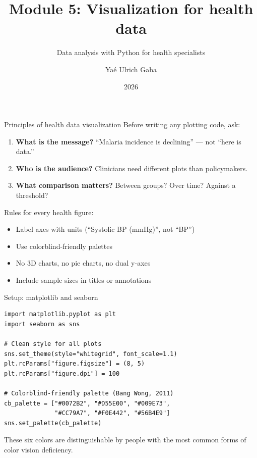 \documentclass[aspectratio=169,11pt]{beamer}
\title{Module 5: Visualization for health data}
\subtitle{Data analysis with Python for health specialists}
\author{Yaé Ulrich Gaba}
\institute{AIRINA Labs}
\date{2026}
\begin{document}
\maketitle

\begin{frame}{Principles of health data visualization}
Before writing any plotting code, ask:
\begin{enumerate}
  \item \textbf{What is the message?} ``Malaria incidence is declining'' --- not ``here is data.''
  \item \textbf{Who is the audience?} Clinicians need different plots than policymakers.
  \item \textbf{What comparison matters?} Between groups? Over time? Against a threshold?
\end{enumerate}

\vspace{6pt}
Rules for \alert{every} health figure:
\begin{itemize}
  \item Label axes with units (``Systolic BP (mmHg)'', not ``BP'')
  \item Use colorblind-friendly palettes
  \item No 3D charts, no pie charts, no dual y-axes
  \item Include sample sizes in titles or annotations
\end{itemize}
\end{frame}

\begin{frame}[fragile]{Setup: matplotlib and seaborn}
\begin{verbatim}
import matplotlib.pyplot as plt
import seaborn as sns

# Clean style for all plots
sns.set_theme(style="whitegrid", font_scale=1.1)
plt.rcParams["figure.figsize"] = (8, 5)
plt.rcParams["figure.dpi"] = 100

# Colorblind-friendly palette (Bang Wong, 2011)
cb_palette = ["#0072B2", "#D55E00", "#009E73",
              "#CC79A7", "#F0E442", "#56B4E9"]
sns.set_palette(cb_palette)
\end{verbatim}

These six colors are distinguishable by people with the most common forms of color vision deficiency.
\end{frame}
\end{document}
